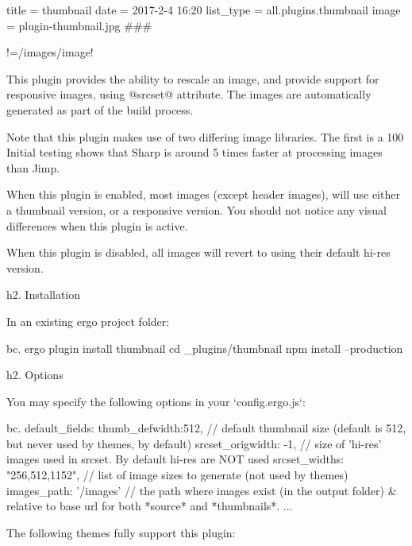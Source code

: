 title = thumbnail
date = 2017-2-4 16:20
list_type = all.plugins.thumbnail
image = plugin-thumbnail.jpg
###

!=/images/{{image}}!

This plugin provides the ability to rescale an image, and provide support for responsive images, using @srcset@ attribute. The images are automatically generated as part of the build process. 

Note that this plugin makes use of two differing image libraries. The first is a 100%
Initial testing shows that Sharp is around 5 times faster at processing images than Jimp.

When this plugin is enabled, most images (except header images), will use either a thumbnail version, or a responsive version. You should not notice any visual differences when this plugin is active. 

When this plugin is disabled, all images will revert to using their default hi-res version.

h2. Installation

In an existing ergo project folder:

bc.
ergo plugin install thumbnail
cd _plugins/thumbnail
npm install --production


h2. Options 

You may specify the following options in your `config.ergo.js`:

bc.
default_fields: {
	thumb_defwidth:512, // default thumbnail size (default is 512, but never used by themes, by default)
	srcset_origwidth: -1, // size of 'hi-res' images used in srcset. By default hi-res are NOT used
	srcset_widths: "256,512,1152", // list of image sizes to generate (not used by themes)
	images_path: '/images'		// the path where images exist (in the output folder) & relative to base url for both *source* and *thumbnails*.
	...
}


The following themes fully support this plugin:



